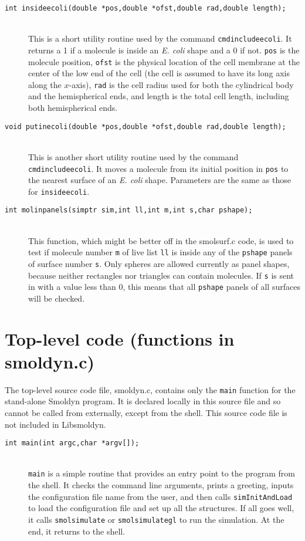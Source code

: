 \documentclass {scrbook}
\newcommand {\ttt} {\texttt}
\begin{document}
\begin{description}
\item[\ttt{int insideecoli(double *pos,double *ofst,double rad,double length);}]
\hfill \\
This is a short utility routine used by the command \ttt{cmdincludeecoli}. It returns a 1 if a molecule is inside an \emph{E. coli} shape and a 0 if not. \ttt{pos} is the molecule position, \ttt{ofst} is the physical location of the cell membrane at the center of the low end of the cell (the cell is assumed to have its long axis along the $x$-axis), \ttt{rad} is the cell radius used for both the cylindrical body and the hemispherical ends, and length is the total cell length, including both hemispherical ends.

\item[\ttt{void putinecoli(double *pos,double *ofst,double rad,double length);}]
\hfill \\
This is another short utility routine used by the command \ttt{cmdincludeecoli}. It moves a molecule from its initial position in \ttt{pos} to the nearest surface of an \emph{E. coli} shape. Parameters are the same as those for \ttt{insideecoli}.

\item[\ttt{int molinpanels(simptr sim,int ll,int m,int s,char pshape);}]
\hfill \\
This function, which might be better off in the smolsurf.c code, is used to test if molecule number \ttt{m} of live list \ttt{ll} is inside any of the \ttt{pshape} panels of surface number \ttt{s}. Only spheres are allowed currently as panel shapes, because neither rectangles nor triangles can contain molecules. If \ttt{s} is sent in with a value less than 0, this means that all \ttt{pshape} panels of all surfaces will be checked.

\end{description}

\section{Top-level code (functions in smoldyn.c)}

The top-level source code file, smoldyn.c, contains only the \ttt{main} function for the stand-alone Smoldyn program. It is declared locally in this source file and so cannot be called from externally, except from the shell. This source code file is not included in Libsmoldyn.

\begin{description}

\item[\ttt{int main(int argc,char *argv[]);}]
\hfill \\
\ttt{main} is a simple routine that provides an entry point to the program from the shell. It checks the command line arguments, prints a greeting, inputs the configuration file name from the user, and then calls \ttt{simInitAndLoad} to load the configuration file and set up all the structures. If all goes well, it calls \ttt{smolsimulate} or \ttt{smolsimulategl} to run the simulation. At the end, it returns to the shell.

\end{description}
\end{document}
